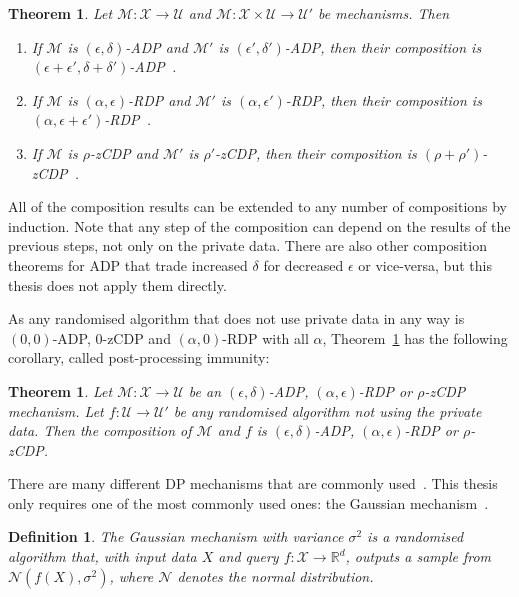 \documentclass[english,twoside,openright]{HYgraduMLDS}
\newtheorem{theorem}[lemma]{Theorem}
\newtheorem{definition}[lemma]{Definition}
\newcommand{\R}{\mathbb{R}}
\newcommand{\calm}{{\mathcal{M}}}
\newcommand{\calx}{{\mathcal{X}}}
\newcommand{\calu}{{\mathcal{U}}}
\newcommand{\caln}{{\mathcal{N}}}
\begin{document}
\begin{theorem}\label{composition-theorem}
    Let \(\calm\colon \calx \to \calu\) and 
    \(\calm\colon \calx\times \calu \to \calu'\) be mechanisms. Then
    \begin{enumerate}
        \item 
            If \(\calm\) is \((\epsilon, \delta)\)-ADP and 
            \(\calm'\) is \((\epsilon', \delta')\)-ADP, then 
            their composition is 
            \((\epsilon + \epsilon', \delta + \delta')\)-ADP~\cite{DKM06}.
        \item 
            If \(\calm\) is \((\alpha, \epsilon)\)-RDP and 
            \(\calm'\) is \((\alpha, \epsilon')\)-RDP, then 
            their composition is \((\alpha, \epsilon + \epsilon')\)-RDP~\cite{Mironov17}.
        \item 
            If \(\calm\) is \(\rho\)-zCDP and 
            \(\calm'\) is \(\rho'\)-zCDP, then 
            their composition is \((\rho + \rho')\)-zCDP~\cite{BuS16}.
    \end{enumerate}
\end{theorem}

All of the composition results can be extended to any number of compositions 
by induction. Note that any step of the composition can depend on the results 
of the previous steps, not only on the private data. There are also other composition
theorems for ADP that trade increased \(\delta\) for decreased \(\epsilon\)
or vice-versa, but this thesis does not apply them directly.

As any randomised algorithm that does not use private data in any way is
\((0, 0)\)-ADP, 0-zCDP and \((\alpha, 0)\)-RDP with all \(\alpha\), 
Theorem~\ref{composition-theorem} has the following corollary, called 
post-processing immunity:

\begin{theorem}
  Let \(\calm\colon \calx\to \calu\) be an \((\epsilon, \delta)\)-ADP,
  \((\alpha, \epsilon)\)-RDP or \(\rho\)-zCDP mechanism.
  Let \(f\colon \calu\to \calu'\) be any randomised algorithm
  not using the private data. Then the composition of \(\calm\) and \(f\)
  is \((\epsilon, \delta)\)-ADP, \((\alpha, \epsilon)\)-RDP or \(\rho\)-zCDP.
\end{theorem}

There are many different DP mechanisms that are commonly used~\cite{DwR14}.
This thesis only requires one of the most commonly 
used ones: the Gaussian mechanism~\cite{DKM06}.
\begin{definition}
  The Gaussian mechanism with variance \(\sigma^2\) is a randomised algorithm that,
  with input data \(X\) and query \(f\colon \calx\to \R^{d}\), outputs a sample from
  \(\caln(f(X), \sigma^2)\), where \(\caln\) denotes the normal distribution.
\end{definition}
\end{document}
